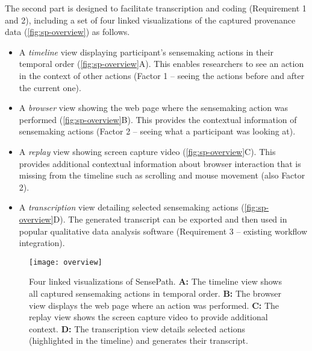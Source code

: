 The second part is designed to facilitate transcription and coding (Requirement 1 and 2), including a set of four linked visualizations of the captured provenance data (\autoref{fig:sp-overview}) as follows.

\begin{itemize}
\item A \emph{timeline} view displaying participant's sensemaking actions in their temporal order (\autoref{fig:sp-overview}A). This enables researchers to see an action in the context of other actions (Factor 1 -- seeing the actions before and after the current one).
\item A \emph{browser} view showing the web page where the sensemaking action was performed (\autoref{fig:sp-overview}B). This provides the contextual information of sensemaking actions (Factor 2 -- seeing what a participant was looking at).
\item A \emph{replay} view showing screen capture video (\autoref{fig:sp-overview}C). This provides additional contextual information about browser interaction that is missing from the timeline such as scrolling and mouse movement (also Factor 2).
\item A \emph{transcription} view detailing selected sensemaking actions (\autoref{fig:sp-overview}D). The generated transcript can be exported and then used in popular qualitative data analysis software (Requirement 3 -- existing workflow integration).
\end{itemize}

\begin{figure}[!htb]
 	\centering
 	\texttt{[image: overview]}
 	\caption[Four linked visualizations of SensePath]{Four linked visualizations of SensePath. \textbf{A:} The timeline view shows all captured sensemaking actions in temporal order. \textbf{B:} The browser view displays the web page where an action was performed. \textbf{C:} The replay view shows the screen capture video to provide additional context. \textbf{D:} The transcription view details selected actions (highlighted in the timeline) and generates their transcript.}
 	\label{fig:sp-overview}
\end{figure}

